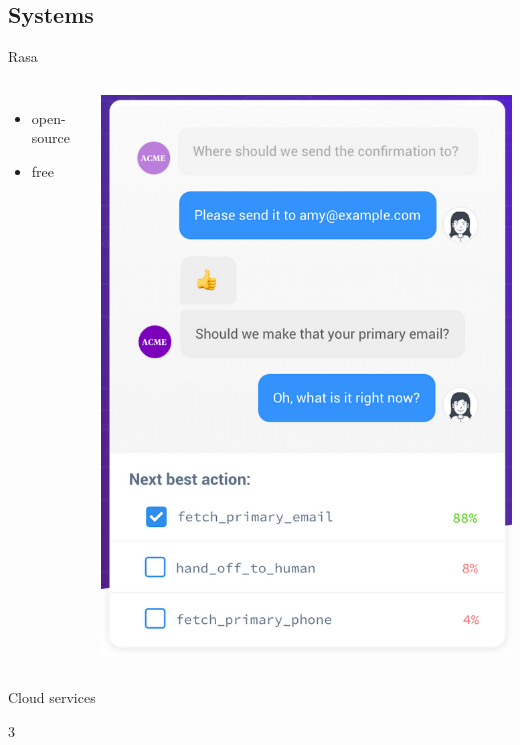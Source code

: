 \documentclass[pdf]{beamer}
\begin{document}
\subsection{Systems}
\begin{frame}{Rasa}
  \begin{columns}
\begin{itemize}
\item open-source
\item free
\end{itemize}
  \begin{center}
\includegraphics[height=0.9\textheight]{figures/rasa.png}
\end{center}
\end{columns}
  \end{frame}

  \begin{frame}{Cloud services}
\item  3
    \end{frame}
    
\end{document}
